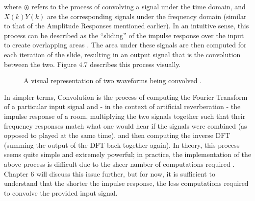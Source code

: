 where $\circledast$ refers to the process of convolving a signal under the time domain, and $X(k)Y(k)$ are the corresponding signals under the frequency domain (similar to that of the Amplitude Responses mentioned earlier). In an intuitive sense, this process can be described as the ``sliding'' of the impulse response over the input to create overlapping areas \cite{pirkle2019designing}. The area under these signals are then computed for each iteration of the slide, resulting in an output signal that is the convolution between the two. Figure 4.7 describes this process visually.

\begin{figure}[h]
	\begin{center}
	\caption{A visual representation of two waveforms being convolved \cite{pirkle2019designing}.}
	\end{center}
\end{figure}

In simpler terms, Convolution is the process of computing the Fourier Transform of a particular input signal and - in the context of artificial reverberation - the impulse response of a room, multiplying the two signals together such that their frequency responses match what one would hear if the signals were combined (as opposed to played at the same time), and then computing the inverse DFT (summing the output of the DFT back together again). In theory, this process seems quite simple and extremely powerful; in practice, the implementation of the above process is difficult due to the sheer number of computations required \cite{pirkle2019designing}. Chapter 6 will discuss this issue further, but for now, it is sufficient to understand that the shorter the impulse response, the less computations required to convolve the provided input signal.

